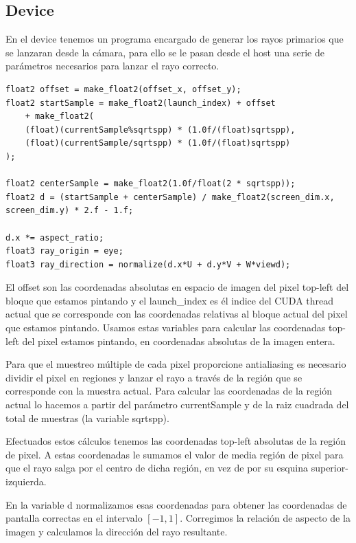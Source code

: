 \clearpage

\subsection{Device}

En el device tenemos un programa encargado de generar los rayos primarios que se lanzaran desde la cámara, para ello se le pasan desde el host una serie de parámetros necesarios para lanzar el rayo correcto.

\begin{lstlisting}
float2 offset = make_float2(offset_x, offset_y);
float2 startSample = make_float2(launch_index) + offset 
	+ make_float2(
	(float)(currentSample%sqrtspp) * (1.0f/(float)sqrtspp),
	(float)(currentSample/sqrtspp) * (1.0f/(float)sqrtspp)
);

float2 centerSample = make_float2(1.0f/float(2 * sqrtspp));
float2 d = (startSample + centerSample) / make_float2(screen_dim.x, screen_dim.y) * 2.f - 1.f;

d.x *= aspect_ratio;
float3 ray_origin = eye;
float3 ray_direction = normalize(d.x*U + d.y*V + W*viewd);
\end{lstlisting}

El offset son las coordenadas absolutas en espacio de imagen del pixel top-left del bloque que estamos pintando y el launch\_index es él indice del CUDA thread actual que se corresponde con las coordenadas relativas al bloque actual del pixel que estamos pintando. Usamos estas variables para calcular las coordenadas top-left del pixel estamos pintando, en coordenadas absolutas de la imagen entera.

\medskip

Para que el muestreo múltiple de cada pixel proporcione antialiasing es necesario dividir el pixel en regiones y lanzar el rayo a través de la región que se corresponde con la muestra actual. Para calcular las coordenadas de la región actual lo hacemos a partir del parámetro currentSample y de la raiz cuadrada del total de muestras (la variable sqrtspp).

\medskip

Efectuados estos cálculos tenemos las coordenadas top-left absolutas de la región de pixel. A estas coordenadas le sumamos el valor de media región de pixel para que el rayo salga por el centro de dicha región, en vez de por su esquina superior-izquierda.

\medskip

En la variable d normalizamos esas coordenadas para obtener las coordenadas de pantalla correctas en el intervalo $[-1, 1]$. Corregimos la relación de aspecto de la imagen y calculamos la dirección del rayo resultante.

